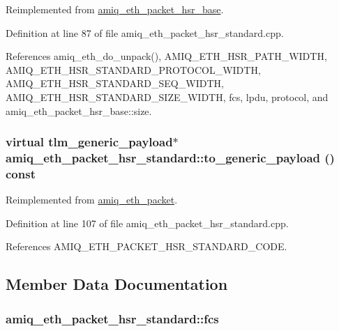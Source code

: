Reimplemented from \hyperlink{classamiq__eth__packet__hsr__base_ae61de71bd90f7a1c605e094845af5ccc}{amiq\_\-eth\_\-packet\_\-hsr\_\-base}.

Definition at line 87 of file amiq\_\-eth\_\-packet\_\-hsr\_\-standard.cpp.

References amiq\_\-eth\_\-do\_\-unpack(), AMIQ\_\-ETH\_\-HSR\_\-PATH\_\-WIDTH, AMIQ\_\-ETH\_\-HSR\_\-STANDARD\_\-PROTOCOL\_\-WIDTH, AMIQ\_\-ETH\_\-HSR\_\-STANDARD\_\-SEQ\_\-WIDTH, AMIQ\_\-ETH\_\-HSR\_\-STANDARD\_\-SIZE\_\-WIDTH, fcs, lpdu, protocol, and amiq\_\-eth\_\-packet\_\-hsr\_\-base::size.\hypertarget{classamiq__eth__packet__hsr__standard_aa145fe8cc2731124d2c9e0bfb61bacf2}{
\subsubsection[{to\_\-generic\_\-payload}]{\setlength{\rightskip}{0pt plus 5cm}virtual tlm\_\-generic\_\-payload$\ast$ amiq\_\-eth\_\-packet\_\-hsr\_\-standard::to\_\-generic\_\-payload () const}}
\label{classamiq__eth__packet__hsr__standard_aa145fe8cc2731124d2c9e0bfb61bacf2}


Reimplemented from \hyperlink{classamiq__eth__packet_a6dd92751d8172eeaa347d71bb415b0d5}{amiq\_\-eth\_\-packet}.

Definition at line 107 of file amiq\_\-eth\_\-packet\_\-hsr\_\-standard.cpp.

References AMIQ\_\-ETH\_\-PACKET\_\-HSR\_\-STANDARD\_\-CODE.

\subsection{Member Data Documentation}
\hypertarget{classamiq__eth__packet__hsr__standard_ac4b90aa3ac89010f2fcfb0fb28d0d06b}{
\subsubsection[{fcs}]{ {\bf amiq\_\-eth\_\-packet\_\-hsr\_\-standard::fcs}}}
\label{classamiq__eth__packet__hsr__standard_ac4b90aa3ac89010f2fcfb0fb28d0d06b}


